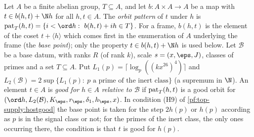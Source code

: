 \begin{definition}\label{pf:top-supply:orbitpattern}
Let $A$ be a finite abelian group, $T\subseteq A$, and let $b:A\times A\to A$ be a map with $t\in b(h,t)+\N h$ for all
$h,t\in A$. The \emph{orbit pattern} of $t$ under $h$ is $\topsupplypat_T(h,t)=\{i<\ord h:\ b(h,t)+ih\in T\}$. For a frame,
$b(h,t)$ is the element of the coset $t+\langle h\rangle$ which comes first in the enumeration of $A$ underlying the frame
(the \emph{base point}); only the property $t\in b(h,t)+\N h$ is used below. Let $\mathcal B$ be a base datum, with ranks
$R$ (of rank $k$), scale $s=(x,\eps,J)$, classes of primes and a set $T\subseteq A$. Put
$L_1(p)=\lceil\log_p((kx^{26})^4)\rceil$ and $L_2(\mathcal B)=2\sup\{L_1(p):\ p\text{ a prime of the inert class}\}$ (a
supremum in $\N$). An element $t\in A$ is \emph{good for $h\in A$ relative to $\mathcal B$} if $\operatorname{pat}_T(h,t)$ is a
good orbit for $(\ord h,L_2(\mathcal B),K_\eps,r_\eps,\delta_1,h_\eps,x)$. In condition (H9) of \cref{pf:top-supply:hostgood}
the base point is taken for the step $2h(p)$ or $h(p)$ according as $p$ is in the signal class or not; for the primes of
the inert class, the only ones occurring there, the condition is that $t$ is good for $h(p)$.
 
 
 
\end{definition}

